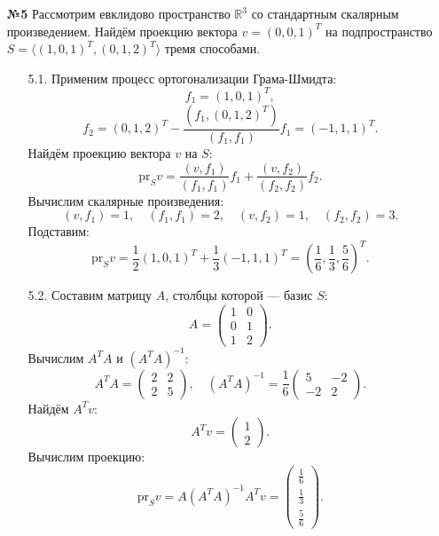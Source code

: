 \documentclass[a4paper]{article}
\begin{document}
\begin{enumerate}
    \item[\textbf{№5}]
    Рассмотрим евклидово пространство \(\mathbb{R}^3\) со стандартным скалярным произведением. Найдём проекцию вектора \( v = (0, 0, 1)^T \) на подпространство \( S = \langle (1, 0, 1)^T, (0, 1, 2)^T \rangle \) тремя способами.
    
    \begin{enumerate}
        \item[5.1.]Применим процесс ортогонализации Грама-Шмидта:
        \[
        f_1 = (1, 0, 1)^T,
        \]
        \[
        f_2 = (0, 1, 2)^T - \frac{(f_1, (0, 1, 2)^T)}{(f_1, f_1)} f_1 = (-1, 1, 1)^T.
        \]
        Найдём проекцию вектора \( v \) на \( S \):
        \[
        \text{pr}_S v = \frac{(v, f_1)}{(f_1, f_1)} f_1 + \frac{(v, f_2)}{(f_2, f_2)} f_2.
        \]
        Вычислим скалярные произведения:
        \[
        (v, f_1) = 1, \quad (f_1, f_1) = 2, \quad (v, f_2) = 1, \quad (f_2, f_2) = 3.
        \]
        Подставим:
        \[
        \text{pr}_S v = \frac{1}{2} (1, 0, 1)^T + \frac{1}{3} (-1, 1, 1)^T = \left(\frac{1}{6}, \frac{1}{3}, \frac{5}{6}\right)^T.
        \]

        \item[5.2.]Составим матрицу \( A \), столбцы которой — базис \( S \):
        \[
        A = \begin{pmatrix} 1 & 0 \\ 0 & 1 \\ 1 & 2 \end{pmatrix}.
        \]
        Вычислим \( A^T A \) и \((A^T A)^{-1}\):
        \[
        A^T A = \begin{pmatrix} 2 & 2 \\ 2 & 5 \end{pmatrix}, \quad (A^T A)^{-1} = \frac{1}{6} \begin{pmatrix} 5 & -2 \\ -2 & 2 \end{pmatrix}.
        \]
        Найдём \( A^T v \):
        \[
        A^T v = \begin{pmatrix} 1 \\ 2 \end{pmatrix}.
        \]
        Вычислим проекцию:
        \[
        \text{pr}_S v = A(A^T A)^{-1} A^T v = \begin{pmatrix} \frac{1}{6} \\ \frac{1}{3} \\ \frac{5}{6} \end{pmatrix}.
        \]


\end{enumerate}
\end{enumerate}
\end{document}
